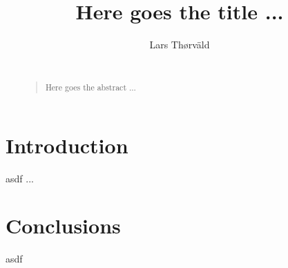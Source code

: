 \documentclass[a4paper,preprint]{sig-alternate-xt}
\begin{document}
\title{Here goes the title ...}


%
\author{
%
\alignauthor Lars Th{\o}rv{\"a}ld\\
       \\
}



\maketitle

\begin{abstract}
\begin{quote}
Here goes the abstract ... 
\end{quote}
\end{abstract}

\section{Introduction}
asdf ...

\blinddocument

\cite{Spector90}

\blinddocument

\section{Conclusions}
asdf



\end{document}
